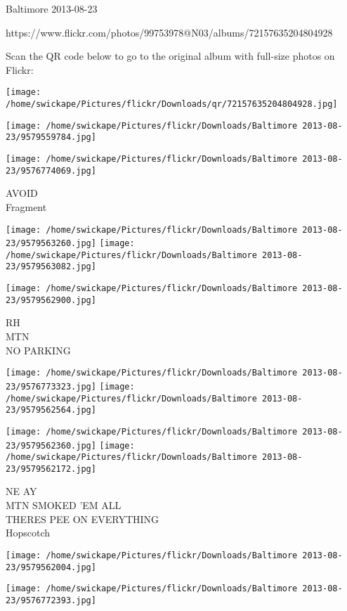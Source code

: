 \documentclass[10pt,letterpaper]{article}
\begin{document}
Baltimore 2013-08-23

https://www.flickr.com/photos/99753978@N03/albums/72157635204804928

Scan the QR code below to go to the original album with full-size photos on Flickr:

\texttt{[image: /home/swickape/Pictures/flickr/Downloads/qr/72157635204804928.jpg]}
\pagebreak

\texttt{[image: /home/swickape/Pictures/flickr/Downloads/Baltimore 2013-08-23/9579559784.jpg]}

\vspace{0.25in}
\texttt{[image: /home/swickape/Pictures/flickr/Downloads/Baltimore 2013-08-23/9576774069.jpg]}

AVOID\\
Fragment
\pagebreak

\texttt{[image: /home/swickape/Pictures/flickr/Downloads/Baltimore 2013-08-23/9579563260.jpg]}
\texttt{[image: /home/swickape/Pictures/flickr/Downloads/Baltimore 2013-08-23/9579563082.jpg]}

\vspace{0.25in}
\texttt{[image: /home/swickape/Pictures/flickr/Downloads/Baltimore 2013-08-23/9579562900.jpg]}

RH\\
MTN\\
NO PARKING
\pagebreak

\texttt{[image: /home/swickape/Pictures/flickr/Downloads/Baltimore 2013-08-23/9576773323.jpg]}
\texttt{[image: /home/swickape/Pictures/flickr/Downloads/Baltimore 2013-08-23/9579562564.jpg]}

\texttt{[image: /home/swickape/Pictures/flickr/Downloads/Baltimore 2013-08-23/9579562360.jpg]}
\texttt{[image: /home/swickape/Pictures/flickr/Downloads/Baltimore 2013-08-23/9579562172.jpg]}

NE AY\\
MTN SMOKED 'EM ALL\\
THERES PEE ON EVERYTHING\\
Hopscotch
\pagebreak

\texttt{[image: /home/swickape/Pictures/flickr/Downloads/Baltimore 2013-08-23/9579562004.jpg]}

\vspace{0.25in}
\texttt{[image: /home/swickape/Pictures/flickr/Downloads/Baltimore 2013-08-23/9576772393.jpg]}
\end{document}
